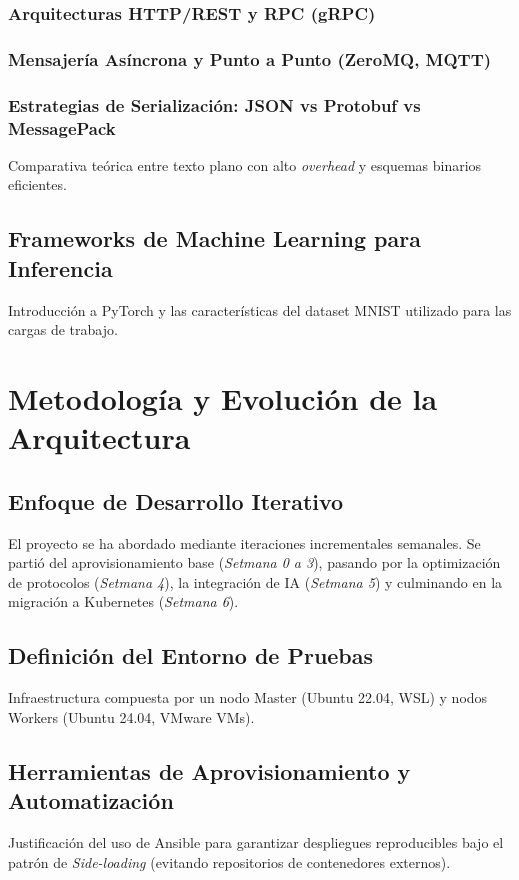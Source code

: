 \documentclass[11pt, a4paper]{report}
\begin{document}
\subsection{Arquitecturas HTTP/REST y RPC (gRPC)}
\subsection{Mensajería Asíncrona y Punto a Punto (ZeroMQ, MQTT)}
\subsection{Estrategias de Serialización: JSON vs Protobuf vs MessagePack}
Comparativa teórica entre texto plano con alto \textit{overhead} y esquemas binarios eficientes.

\section{Frameworks de Machine Learning para Inferencia}
Introducción a PyTorch y las características del dataset MNIST utilizado para las cargas de trabajo.

\chapter{Metodología y Evolución de la Arquitectura}

\section{Enfoque de Desarrollo Iterativo}
El proyecto se ha abordado mediante iteraciones incrementales semanales. Se partió del aprovisionamiento base (\textit{Setmana 0 a 3}), pasando por la optimización de protocolos (\textit{Setmana 4}), la integración de IA (\textit{Setmana 5}) y culminando en la migración a Kubernetes (\textit{Setmana 6}).

\section{Definición del Entorno de Pruebas}
Infraestructura compuesta por un nodo Master (Ubuntu 22.04, WSL) y nodos Workers (Ubuntu 24.04, VMware VMs).

\section{Herramientas de Aprovisionamiento y Automatización}
Justificación del uso de Ansible para garantizar despliegues reproducibles bajo el patrón de \textit{Side-loading} (evitando repositorios de contenedores externos).
\end{document}
